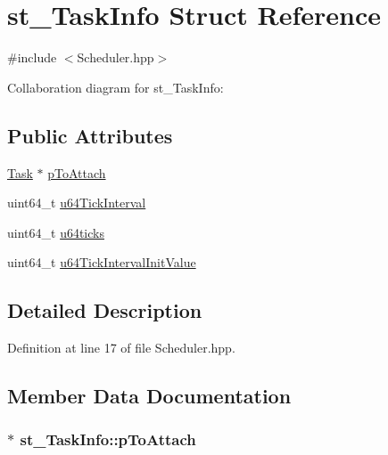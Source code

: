 \hypertarget{structst___task_info}{}\section{st\+\_\+\+Task\+Info Struct Reference}
\label{structst___task_info}


{\ttfamily \#include $<$Scheduler.\+hpp$>$}



Collaboration diagram for st\+\_\+\+Task\+Info\+:
\subsection*{Public Attributes}
\begin{DoxyCompactItemize}
\item 
\hyperlink{class_task}{Task} $\ast$ \hyperlink{structst___task_info_a8f1c2d023852491a22879baf47409172}{p\+To\+Attach}
\item 
uint64\+\_\+t \hyperlink{structst___task_info_abad0b9332ad4c9643b52f6072ab87e60}{u64\+Tick\+Interval}
\item 
uint64\+\_\+t \hyperlink{structst___task_info_a54d576785977f03f224b4e2060f8c8f4}{u64ticks}
\item 
uint64\+\_\+t \hyperlink{structst___task_info_a88e71c1b02161db554520e4ee2f5225f}{u64\+Tick\+Interval\+Init\+Value}
\end{DoxyCompactItemize}


\subsection{Detailed Description}


Definition at line 17 of file Scheduler.\+hpp.



\subsection{Member Data Documentation}
\subsubsection[{\texorpdfstring{p\+To\+Attach}{pToAttach}}]{$\ast$ st\+\_\+\+Task\+Info\+::p\+To\+Attach}\hypertarget{structst___task_info_a8f1c2d023852491a22879baf47409172}{}\label{structst___task_info_a8f1c2d023852491a22879baf47409172}


